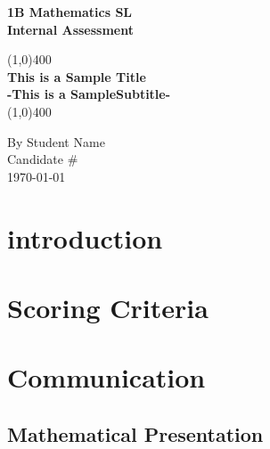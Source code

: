 \documentclass[UTF8, 11pt]{ctexart}
\begin{document}
	
\begin{titlepage}
    \begin{center} %
        \vspace*{1cm}
            \Large{\textbf{1B Mathematics SL}}\\
            \Large{\textbf{Internal Assessment}}\\
           
            \vfill %
           
            \line(1,0){400}\\[1mm] %
            \huge{\textbf{This is a Sample Title}}\\[3mm]
            \Large{\textbf{-This is a SampleSubtitle-}}\\[1mm]
            \line(1,0){400}
           
            \vfill

            By Student Name\\
            Candidate \# \\
            \today \\
    \end{center}
\end{titlepage}

\tableofcontents
\thispagestyle{empty} %
\clearpage %

\setcounter{page}{1}
\section{introduction}

\section{Scoring Criteria}

\section{Communication}

    \subsection{Mathematical Presentation}
\end{document}
